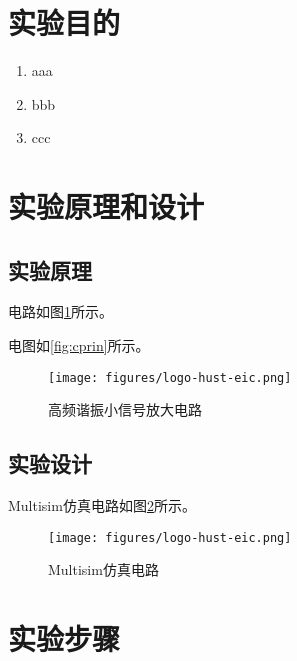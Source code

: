 \documentclass[12pt]{article}
\begin{document}

\newpage

\begin{center}
    \begin{spacing}{1.5}
    \tableofcontents
    \end{spacing}
\end{center}
\newpage

\pagestyle{fancy}

\section{实验目的}

\begin{enumerate}
    \item aaa
    \item bbb
    \item ccc
\end{enumerate}


\section{实验原理和设计}

\subsection{实验原理}

电路如图\ref{fig:cprin}所示。

电图如\autoref{fig:cprin}所示。

\begin{figure}[htbp]
    \centering
    \texttt{[image: figures/logo-hust-eic.png]}
    \caption{高频谐振小信号放大电路}
    \label{fig:cprin}
\end{figure}

\subsection{实验设计}

Multisim仿真电路如图\ref{fig:csim}所示。

\begin{figure}[htbp]
    \centering
    \texttt{[image: figures/logo-hust-eic.png]}
    \caption{Multisim仿真电路}
    \label{fig:csim}
\end{figure}


\section{实验步骤}
\end{document}
